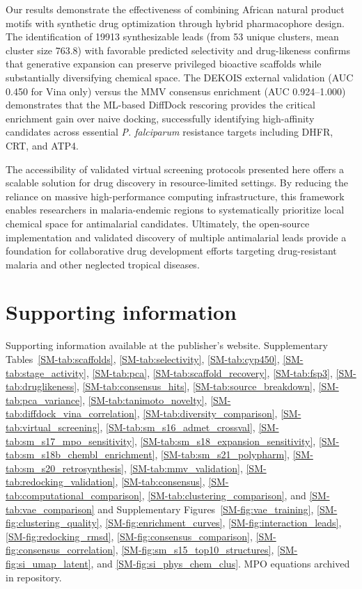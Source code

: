 \documentclass[journal=jcisd8,manuscript=article]{achemso}
\begin{document}
Our results demonstrate the effectiveness of combining African natural product motifs with synthetic drug optimization through hybrid pharmacophore design. The identification of \num{19913} synthesizable leads (from \num{53} unique clusters, mean cluster size \num{763.8}) with favorable predicted selectivity and drug-likeness confirms that generative expansion can preserve privileged bioactive scaffolds while substantially diversifying chemical space. The DEKOIS external validation (AUC \num{0.450} for Vina only) versus the MMV consensus enrichment (AUC \numrange{0.924}{1.000}) demonstrates that the ML-based DiffDock rescoring provides the critical enrichment gain over naive docking, successfully identifying high-affinity candidates across essential \textit{P. falciparum} resistance targets including DHFR, CRT, and ATP4.

The accessibility of validated virtual screening protocols presented here offers a scalable solution for drug discovery in resource-limited settings. By reducing the reliance on massive high-performance computing infrastructure, this framework enables researchers in malaria-endemic regions to systematically prioritize local chemical space for antimalarial candidates. Ultimately, the open-source implementation and validated discovery of multiple antimalarial leads provide a foundation for collaborative drug development efforts targeting drug-resistant malaria and other neglected tropical diseases.


\section*{Supporting information}
Supporting information available at the publisher's website. Supplementary Tables~\ref{SM-tab:scaffolds}, \ref{SM-tab:selectivity}, \ref{SM-tab:cyp450}, \ref{SM-tab:stage_activity}, \ref{SM-tab:pca}, \ref{SM-tab:scaffold_recovery}, \ref{SM-tab:fsp3}, \ref{SM-tab:druglikeness}, \ref{SM-tab:consensus_hits}, \ref{SM-tab:source_breakdown}, \ref{SM-tab:pca_variance}, \ref{SM-tab:tanimoto_novelty}, \ref{SM-tab:diffdock_vina_correlation}, \ref{SM-tab:diversity_comparison}, \ref{SM-tab:virtual_screening}, \ref{SM-tab:sm_s16_admet_crossval}, \ref{SM-tab:sm_s17_mpo_sensitivity}, \ref{SM-tab:sm_s18_expansion_sensitivity}, \ref{SM-tab:sm_s18b_chembl_enrichment}, \ref{SM-tab:sm_s21_polypharm}, \ref{SM-tab:sm_s20_retrosynthesis}, \ref{SM-tab:mmv_validation}, \ref{SM-tab:redocking_validation}, \ref{SM-tab:consensus}, \ref{SM-tab:computational_comparison}, \ref{SM-tab:clustering_comparison}, and \ref{SM-tab:vae_comparison} and Supplementary Figures~\ref{SM-fig:vae_training}, \ref{SM-fig:clustering_quality}, \ref{SM-fig:enrichment_curves}, \ref{SM-fig:interaction_leads}, \ref{SM-fig:redocking_rmsd}, \ref{SM-fig:consensus_comparison}, \ref{SM-fig:consensus_correlation}, \ref{SM-fig:sm_s15_top10_structures}, \ref{SM-fig:si_umap_latent}, and \ref{SM-fig:si_phys_chem_clus}. MPO equations archived in repository.
\end{document}
